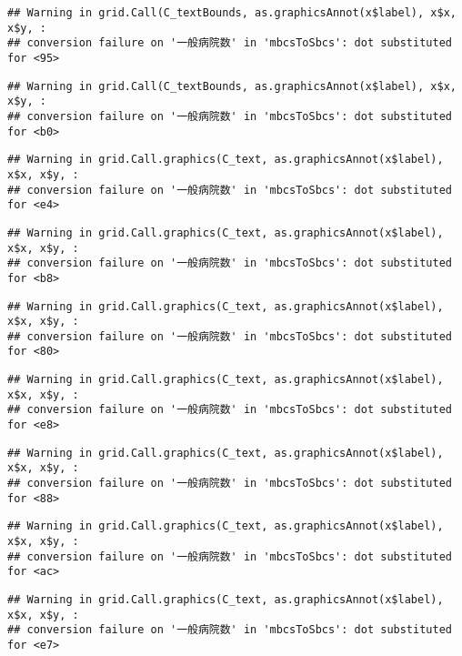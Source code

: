 \documentclass[
]{article}
\begin{document}
\begin{verbatim}
## Warning in grid.Call(C_textBounds, as.graphicsAnnot(x$label), x$x, x$y, :
## conversion failure on '一般病院数' in 'mbcsToSbcs': dot substituted for <95>
\end{verbatim}

\begin{verbatim}
## Warning in grid.Call(C_textBounds, as.graphicsAnnot(x$label), x$x, x$y, :
## conversion failure on '一般病院数' in 'mbcsToSbcs': dot substituted for <b0>
\end{verbatim}

\begin{verbatim}
## Warning in grid.Call.graphics(C_text, as.graphicsAnnot(x$label), x$x, x$y, :
## conversion failure on '一般病院数' in 'mbcsToSbcs': dot substituted for <e4>
\end{verbatim}

\begin{verbatim}
## Warning in grid.Call.graphics(C_text, as.graphicsAnnot(x$label), x$x, x$y, :
## conversion failure on '一般病院数' in 'mbcsToSbcs': dot substituted for <b8>
\end{verbatim}

\begin{verbatim}
## Warning in grid.Call.graphics(C_text, as.graphicsAnnot(x$label), x$x, x$y, :
## conversion failure on '一般病院数' in 'mbcsToSbcs': dot substituted for <80>
\end{verbatim}

\begin{verbatim}
## Warning in grid.Call.graphics(C_text, as.graphicsAnnot(x$label), x$x, x$y, :
## conversion failure on '一般病院数' in 'mbcsToSbcs': dot substituted for <e8>
\end{verbatim}

\begin{verbatim}
## Warning in grid.Call.graphics(C_text, as.graphicsAnnot(x$label), x$x, x$y, :
## conversion failure on '一般病院数' in 'mbcsToSbcs': dot substituted for <88>
\end{verbatim}

\begin{verbatim}
## Warning in grid.Call.graphics(C_text, as.graphicsAnnot(x$label), x$x, x$y, :
## conversion failure on '一般病院数' in 'mbcsToSbcs': dot substituted for <ac>
\end{verbatim}

\begin{verbatim}
## Warning in grid.Call.graphics(C_text, as.graphicsAnnot(x$label), x$x, x$y, :
## conversion failure on '一般病院数' in 'mbcsToSbcs': dot substituted for <e7>
\end{verbatim}
\end{document}

